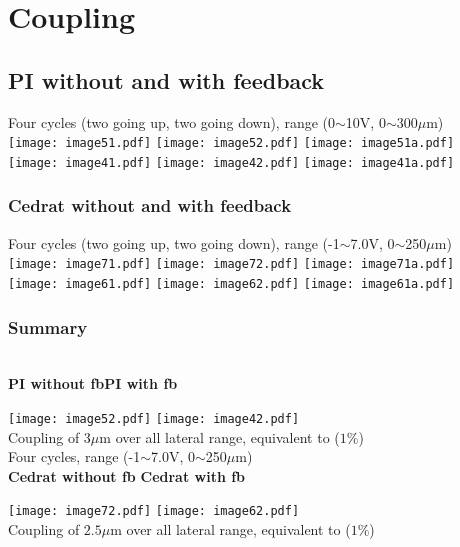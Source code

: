 \section{Coupling}
\subsection{PI without and with feedback}
Four cycles (two going up, two going down), range (0$\sim$10V, 0$\sim$300$\mu$m)\\
\texttt{[image: image51.pdf]}
\texttt{[image: image52.pdf]}
\texttt{[image: image51a.pdf]}\\

\texttt{[image: image41.pdf]}
\texttt{[image: image42.pdf]}
\texttt{[image: image41a.pdf]}\\

\subsubsection{Cedrat without and with feedback}
Four cycles (two going up, two going down), range (-1$\sim$7.0V, 0$\sim$250$\mu$m)\\
\texttt{[image: image71.pdf]}
\texttt{[image: image72.pdf]}
\texttt{[image: image71a.pdf]}\\
\texttt{[image: image61.pdf]}
\texttt{[image: image62.pdf]}
\texttt{[image: image61a.pdf]}\\

\subsubsection{Summary}
\\
\textbf{PI without fb}\hspace*{2.6cm}\textbf{PI with  fb}\par
\texttt{[image: image52.pdf]}\hspace*{2cm}
\texttt{[image: image42.pdf]}\\
Coupling of $3\mu$m over all lateral range, equivalent to ($1\%$)\\
{\tiny Four cycles, range (-1$\sim$7.0V, 0$\sim$250$\mu$m)}\\
\textbf{Cedrat without fb} \hspace*{1.6cm}\textbf{Cedrat with fb}\par
\texttt{[image: image72.pdf]}\hspace*{2cm}
\texttt{[image: image62.pdf]}\\
Coupling of $2.5\mu$m over all lateral range, equivalent to ($1\%$)\par

